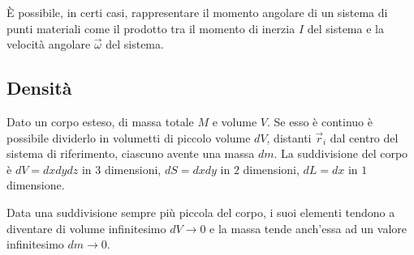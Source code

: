 \documentclass{article}
\numberwithin{equation}{subsection}
\begin{document}
\begin{center}\end{center}

\`{E} possibile, in certi casi, rappresentare il momento angolare di un sistema di punti materiali 
come il prodotto tra il momento di inerzia $I$ del sistema e la velocità angolare $\vec\omega$ del sistema. 

\subsection{Densità}

Dato un corpo esteso, di massa totale $M$ e volume $V$. Se esso è continuo è possibile dividerlo 
in volumetti di piccolo volume $dV$, distanti $\vec{r}_i$ dal centro del sistema di 
riferimento, ciascuno avente una massa $dm$. La suddivisione del corpo è 
$dV=dxdydz$ in $3$ dimensioni, $dS=dxdy$ in $2$ dimensioni, 
$dL=dx$ in $1$ dimensione. 

Data una suddivisione sempre più piccola del corpo, i suoi elementi tendono a diventare di volume infinitesimo $dV\to 0$ e 
la massa tende anch'essa ad un valore infinitesimo $dm\to 0$.
\end{document}
